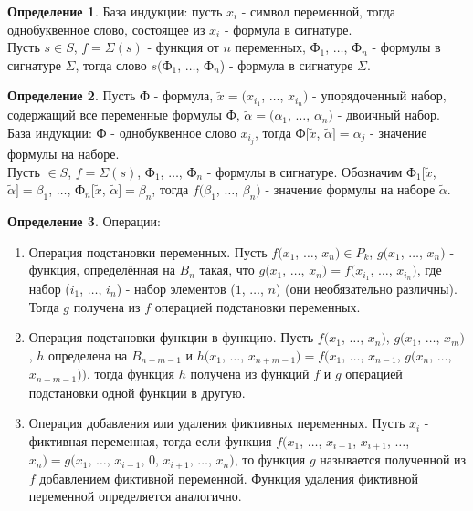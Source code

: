 \documentclass[a4paper, 12pt]{article}
\theoremstyle{definition}
\newtheorem*{definition}{Определение}
\theoremstyle{plain}
\theoremstyle{remark}
\begin{document}
  \begin{definition}
    База индукции: пусть $x_i$ - символ переменной, тогда однобуквенное слово, состоящее из $x_i$ - формула в сигнатуре.\\
    Пусть $s\in S$, $f=\Sigma(s)$ - функция от $n$ переменных, Ф$_1$, $\ldots$, Ф$_n$ - формулы в сигнатуре $\Sigma$, тогда слово $s($Ф$_1$, $\ldots$, Ф$_n$) - формула в сигнатуре $\Sigma$.
  \end{definition}
  \begin{definition}
    Пусть Ф - формула, $\tilde{x}=(x_{i_1}$, $\ldots$, $x_{i_n})$ - упорядоченный набор, содержащий все переменные формулы Ф, $\tilde{\alpha}=(\alpha_1$, $\ldots$, $\alpha_n)$ - двоичный набор.\\
    База индукции: Ф - однобуквенное слово $x_{i_j}$, тогда Ф$[\tilde{x}$, $\tilde{\alpha}]=\alpha_j$ - значение формулы на наборе.\\
    Пусть $\in S$, $f=\Sigma(s)$, Ф$_1$, $\ldots$, Ф$_n$ - формулы в сигнатуре. Обозначим Ф$_1[\tilde{x}$, $\tilde{\alpha}]=\beta_1$, $\ldots$, Ф$_n[\tilde{x}$, $\tilde{\alpha}]=\beta_n$, тогда $f(\beta_1$, $\ldots$, $\beta_n)$ - значение формулы на наборе $\tilde{\alpha}$.
  \end{definition}
  \begin{definition}
    Операции:
    \begin{enumerate}
      \item Операция подстановки переменных. Пусть $f(x_1$, $\ldots$, $x_n)\in P_k$, $g(x_1$, $\ldots$, $x_n)$ - функция, определённая на $B_n$ такая, что $g(x_1$, $\ldots$, $x_n)=f(x_{i_1}$, $\ldots$, $x_{i_n})$, где набор ($i_1$, $\ldots$, $i_n$) - набор элементов ($1$, $\ldots$, $n$) (они необязательно различны). Тогда $g$ получена из $f$ операцией подстановки переменных.
      \item Операция подстановки функции в функцию. Пусть $f(x_1$, $\ldots$, $x_n)$, $g(x_1$, $\ldots$, $x_m)$, $h$ определена на $B_{n+m-1}$ и $h(x_1$, $\ldots$, $x_{n+m-1})=f(x_1$, $\ldots$, $x_{n-1}$, $g(x_n$, $\ldots$, $x_{n+m-1}))$, тогда функция $h$ получена из функций $f$ и $g$ операцией подстановки одной функции в другую.
      \item Операция добавления или удаления фиктивных переменных. Пусть $x_i$ - фиктивная переменная, тогда если функция $f(x_1$, $\ldots$, $x_{i-1}$, $x_{i+1}$, $\ldots$, $x_n)=g(x_1$, $\ldots$, $x_{i-1}$, $0$, $x_{i+1}$, $\ldots$, $x_n)$, то функция $g$ называется полученной из $f$ добавлением фиктивной переменной. Функция удаления фиктивной переменной определяется аналогично.
    \end{enumerate}
  \end{definition}
\end{document}
